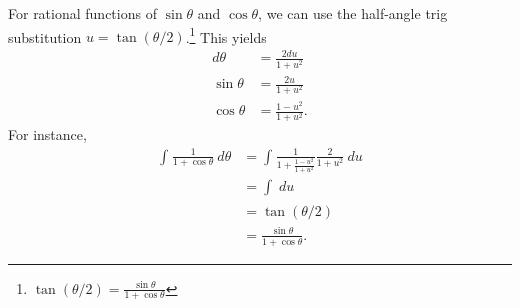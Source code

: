 \documentclass[10pt]{mypackage}
\begin{document}
\begin{example}
  For rational functions of $\sin\theta$ and $\cos\theta$, we can use the half-angle trig substitution $u = \tan(\theta/2)$.\footnote{$\tan(\theta/2) = \frac{\sin\theta}{1 + \cos\theta}$} This yields
  \begin{align*}
    d\theta &= \frac{2du}{1 + u^2}\\
    \sin\theta &= \frac{2u}{1 + u^2}\\
    \cos\theta &= \frac{1-u^2}{1 + u^2}.
  \end{align*}
  For instance,
  \begin{align*}
    \int_{}^{} \frac{1}{1+\cos\theta}\:d\theta &= \int_{}^{} \frac{1}{1 + \frac{1-u^2}{1+u^2}}\frac{2}{1 + u^2} \:du\\
                                               &= \int_{}^{} \:du\\
                                               &= \tan(\theta/2)\\
                                               &= \frac{\sin\theta}{1 + \cos\theta}.
  \end{align*}
\end{example}
\end{document}
